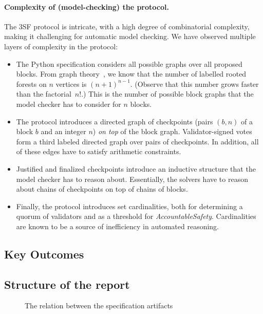 \paragraph{Complexity of (model-checking) the protocol.} The 3SF protocol is
intricate, with a high degree of combinatorial complexity, making it challenging
for automatic model checking. We have observed multiple layers of complexity in the protocol:
\begin{itemize}
  \item The Python specification considers all possible graphs over all proposed
    blocks. From graph theory~\cite{cayley1878theorem}, we know that the number
    of labelled rooted forests on $n$ vertices is ${(n+1)}^{n-1}$. (Observe that
    this number grows faster than the factorial~$n!$.) This is the number of
    possible block graphs that the model checker has to consider for $n$ blocks.
  \item The protocol introduces a directed graph of checkpoints (pairs $(b,n)$
    of a block $b$ and an integer $n$) \emph{on top} of the block graph.
    Validator-signed votes form a third labeled directed graph over pairs of
    checkpoints. In addition, all of these edges have to satisfy arithmetic
    constraints.
  \item Justified and finalized checkpoints introduce an inductive structure
    that the model checker has to reason about. Essentially, the solvers have to
    reason about chains of checkpoints on top of chains of blocks.
  \item Finally, the protocol introduces set cardinalities, both for determining a
    quorum of validators and as a threshold for \textit{AccountableSafety}.
    Cardinalities are known to be a source of inefficiency in automated
    reasoning.
\end{itemize}

\subsection{Key Outcomes}\label{sec:discussion}



\subsection{Structure of the report}

\begin{figure}
  
  \caption{The relation between the specification artifacts}\label{fig:artifacts}
\end{figure}

